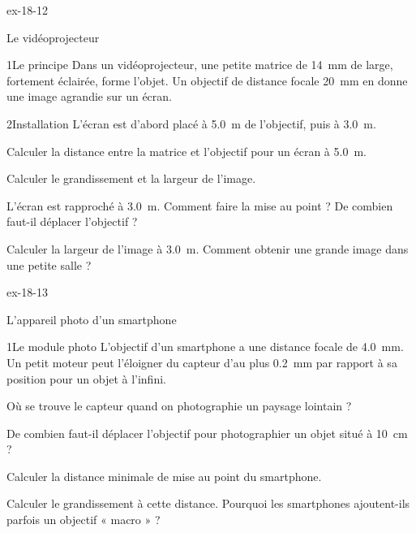 \begin{blocLivre}{ex-18-12}
\begin{exercice}[3]{Le vidéoprojecteur}
\begin{docu}{1}{Le principe}
Dans un vidéoprojecteur, une petite matrice de \qty{14}{mm} de large, fortement éclairée, forme l'objet. Un objectif de distance focale
\qty{20}{mm} en donne une image agrandie sur un écran.
\end{docu}
\begin{docu}{2}{Installation}
L'écran est d'abord placé à \qty{5,0}{m} de l'objectif, puis à \qty{3,0}{m}.
\end{docu}
\begin{questions}
\item Calculer la distance entre la matrice et l'objectif pour un écran à \qty{5,0}{m}.
\item Calculer le grandissement et la largeur de l'image.
\item \initiative L'écran est rapproché à \qty{3,0}{m}. Comment faire la mise au point ? De combien faut-il déplacer l'objectif ?
\item Calculer la largeur de l'image à \qty{3,0}{m}. Comment obtenir une grande image dans une petite salle ?
\end{questions}
\end{exercice}
\end{blocLivre}
\begin{blocLivre}{ex-18-13}
\begin{exercice}[3]{L'appareil photo d'un smartphone}
\begin{docu}{1}{Le module photo}
L'objectif d'un smartphone a une distance focale de \qty{4,0}{mm}. Un petit moteur peut l'éloigner du capteur d'au plus \qty{0,2}{mm} par rapport à
sa position pour un objet à l'infini.
\end{docu}
\begin{questions}
\item Où se trouve le capteur quand on photographie un paysage lointain ?
\item De combien faut-il déplacer l'objectif pour photographier un objet situé à \qty{10}{cm} ?
\item \initiative Calculer la distance minimale de mise au point du smartphone.
\item Calculer le grandissement à cette distance. Pourquoi les smartphones ajoutent-ils parfois un objectif « macro » ?
\end{questions}
\end{exercice}
\end{blocLivre}
